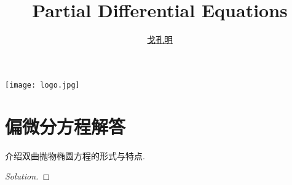 \documentclass[cn,hazy,blue,14pt,screen]{elegantnote}
\title{Partial Differential Equations}
\author{\href{http://github.com/gkm0120}{\LARGE 戈孔明}}
\date{\zhtoday}
\begin{document}
\maketitle

\centerline{
  \texttt{[image: logo.jpg]}
}



\newpage

	\section{偏微分方程解答}
	\begin{example}
		介绍双曲抛物椭圆方程的形式与特点.
		\begin{proof}[Solution]

\end{proof}
\end{example}
\end{document}
